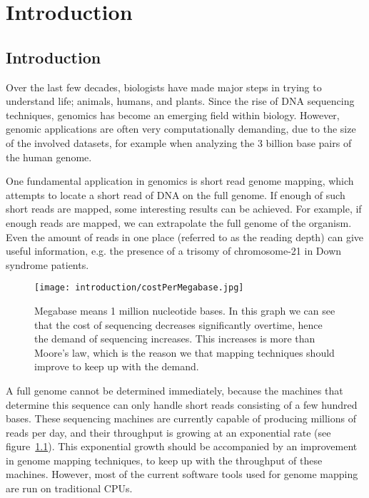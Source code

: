 
\chapter{Introduction}

\section{Introduction}
Over the last few decades, biologists have made major steps in trying to understand life; animals, humans, and plants. Since the rise of DNA sequencing techniques, genomics has become an emerging field within biology. However, genomic applications are often very computationally demanding, due to the size of the involved datasets, for example when analyzing the 3 billion base pairs of the human genome.

One fundamental application in genomics is short read genome mapping, which attempts to locate a short read of DNA on the full genome. If enough of such short reads are mapped, some interesting results can be achieved. For example, if enough reads are mapped, we can extrapolate the full genome of the organism. Even the amount of reads in one place (referred to as the reading depth) can give useful information, e.g. the presence of a trisomy of chromosome-21 in Down syndrome patients.

\begin{figure}[H]
	\centering
	\texttt{[image: introduction/costPerMegabase.jpg]}
	\caption{Megabase means 1 million nucleotide bases. In this graph we can see that the cost of sequencing decreases significantly overtime, hence the demand of sequencing increases. This increases is more than Moore's law, which is the reason we that mapping techniques should improve to keep up with the demand.}
	\label{fig:costMb}
\end{figure}

A full genome cannot be determined immediately, because the machines that determine this sequence can only handle short reads consisting of a few hundred bases. These sequencing machines are currently capable of producing millions of reads per day, and their throughput is growing at an exponential rate (see figure~\ref{fig:costMb}). This exponential growth should be accompanied by an improvement in genome mapping techniques, to keep up with the throughput of these machines. However, most of the current software tools used for genome mapping are run on traditional CPUs. 

